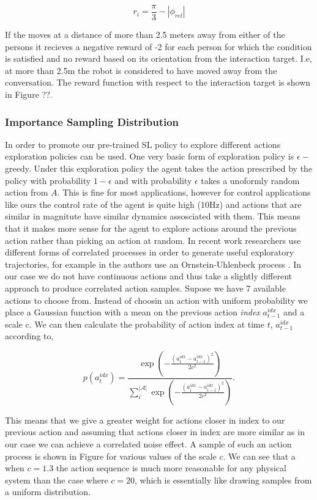 \documentclass[a4paper,11pt]{report}
\begin{document}
\begin{equation}
	r_i = \frac{\pi}{3} -|\phi_{rel}| 
\end{equation}

If the moves at a distance of more than 2.5 meters away from either of the persons it recieves a negative reward of -2 for each person for which the condition is satisfied and no reward based on its orientation from the interaction target. I.e, at more than 2.5m the robot is considered to have moved away from the conversation. The reward function with respect to the interaction target is shown in Figure ??.

\subsubsection{Importance Sampling Distribution}
In order to promote our pre-trained SL policy to explore different actions exploration policies can be used. One very basic form of exploration policy is $\epsilon-$greedy. Under this exploration policy the agent takes the action prescribed by the policy with probability $1-\epsilon$ and with probability $\epsilon$ takes a unoformly random action from $A$. This is fine for most applications, however for control applications like ours the control rate of the agent is quite high (10Hz) and actions that are similar in magnitute have similar dynamics assosciated with them. This means that it makes more sense for the agent to explore actions around the previous action rather than picking an action at random. In recent work researchers use different forms of correlated processes in order to generate useful exploratory trajectories, for example in \cite{lillicrap2015continuous} the authors use an  Ornstein-Uhlenbeck process \cite{uhlenbeck1930theory}. In our case we do not have continuous actions and thus take a slightly different approach to produce correlated action samples. Supose we have 7 available actions to choose from. Instead of choosin an action with uniform probability we place a Gaussian function with a mean on the previous action \emph{index} $a^{idx}_{t-1}$ and a scale c. We can then calculate the probability of action index at time $t$, $a^{idx}_{t-1}$ according to,   


\begin{equation}
	p(a^{idx}_t) =\frac{\exp(-\frac{(a^{idx}_t-a^{idx}_{t-1})^2}{2c^2})}{\sum_i^{|\mathcal{A}|} \exp(-\frac{(a^{idx}_i-a^{idx}_{t-1})^2}{2c^2}) }.
\end{equation}

This means that we give a greater weight for actions closer in index to our previous action and assuming that actions closer in index are more similar as in our case we can achieve a correlated noise effect. A sample of such an action process is shown in Figure for various values of the scale $c$. We can see that a when $c=1.3$ the action sequence is much more reasonable for any physical system than the case where $c=20$, which is essentially like drawing samples from a uniform distribution. 
\end{document}
